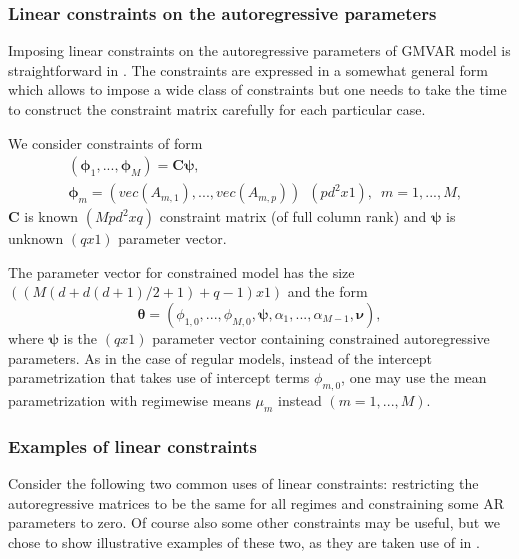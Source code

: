 \documentclass[nojss]{jss}
\begin{document}
\subsubsection{Linear constraints on the autoregressive parameters}
Imposing linear constraints on the autoregressive parameters of GMVAR model is straightforward in . The constraints are expressed in a somewhat general form which allows to impose a wide class of constraints but one needs to take the time to construct the constraint matrix carefully for each particular case.

We consider constraints of form
\begin{align}
& (\boldsymbol{\phi}_1,...,\boldsymbol{\phi}_M) = \boldsymbol{C}\boldsymbol{\psi},\\
& \boldsymbol{\phi}_m=(vec(A_{m,1}),...,vec(A_{m,p}))\enspace (pd^2x1), \enspace m=1,...,M,
\end{align}
$\boldsymbol{C}$ is known $(Mpd^2xq)$ constraint matrix (of full column rank) and $\boldsymbol{\psi}$ is unknown $(qx1)$ parameter vector.

The parameter vector for constrained model has the size $((M(d+d(d+1)/2+1)+q-1)x1)$ and the form
\begin{equation}
\boldsymbol{\theta} = (\phi_{1,0},...,\phi_{M,0},\boldsymbol{\psi},\alpha_1,...,\alpha_{M-1},\boldsymbol{\nu}),
\end{equation}
where $\boldsymbol{\psi}$ is the $(qx1)$ parameter vector containing constrained autoregressive parameters. As in the case of regular models, instead of the intercept parametrization that takes use of intercept terms $\phi_{m,0}$, one may use the mean parametrization with regimewise means $\mu_m$ instead $(m=1,...,M)$.

\subsubsection{Examples of linear constraints}
Consider the following two common uses of linear constraints: restricting the autoregressive matrices to be the same for all regimes and constraining some AR parameters to zero. Of course also some other constraints may be useful, but we chose to show illustrative examples of these two, as they are taken use of in \cite{Kalliovirta+Meitz+Saikkonen:2016}.
\end{document}
